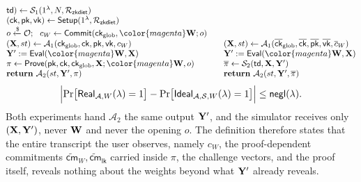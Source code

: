 \documentclass[sigconf,anonymous,review,balance=false]{acmart}
\newcommand{\rev}[1]{{\color{magenta}#1}}
\begin{document}
\begin{definition}
\[\begin{array}{@{}l@{\qquad}l@{}}
 \mathsf{td}) \leftarrow
 \mathcal{S}_{1}(1^{\lambda}, N, \mathcal{R}_{\mathsf{zkdiet}}) \\
(\mathsf{ck}, \mathsf{pk}, \mathsf{vk}) \leftarrow
 \mathsf{Setup}(1^{\lambda}, \mathcal{R}_{\mathsf{zkdiet}}) & \\
o \xleftarrow{\$} \mathcal{O};\ \
 c_{W} \leftarrow \mathsf{Commit}(\mathsf{ck}_{\mathrm{glob}}, \rev{\W}; o) & \\
(\X, st) \leftarrow \mathcal{A}_{1}(\mathsf{ck}_{\mathrm{glob}},
 \mathsf{ck}, \mathsf{pk}, \mathsf{vk}, c_{W}) &
(\X, st) \leftarrow
 \mathcal{A}_{1}(\overline{\mathsf{ck}}_{\mathrm{glob}},
 \overline{\mathsf{ck}}, \overline{\mathsf{pk}},
 \overline{\mathsf{vk}}, \overline{c}_{W}) \\
\Y' := \mathsf{Eval}(\rev{\W}, \X) &
\Y' := \mathsf{Eval}(\rev{\W}, \X) \\
\pi \leftarrow \mathsf{Prove}(\mathsf{pk}, \mathsf{ck},
 \mathsf{ck}_{\mathrm{glob}}, \X; \rev{\W}, o) &
\overline{\pi} \leftarrow \mathcal{S}_{2}(\mathsf{td}, \X,
 \Y') \\
\mathbf{return}\ \mathcal{A}_{2}(st, \Y', \pi) &
\mathbf{return}\ \mathcal{A}_{2}(st, \Y', \overline{\pi})
\end{array}
\]
\[
\Bigl| \Pr\bigl[\mathsf{Real}_{\mathcal{A}, W}(\lambda) = 1\bigr] -
       \Pr\bigl[\mathsf{Ideal}_{\mathcal{A}, \mathcal{S}, W}(\lambda) = 1\bigr]
\Bigr| \le \mathsf{negl}(\lambda).
\]
Both experiments hand $\mathcal{A}_{2}$ the same output ${\mathbf{Y}}'$, and the simulator receives only $({\mathbf{X}}, {\mathbf{Y}}')$, never \rev{${\mathbf{W}}$} and never the
opening $o$. The definition therefore states that the entire transcript the user observes, namely $c_{W}$, the proof-dependent commitments $\widetilde{\mathsf{cm}}_{W}, \widetilde{\mathsf{cm}}_{\mathsf{lk}}$ carried inside $\pi$, the challenge vectors, and the proof itself, reveals nothing about the weights beyond what ${\mathbf{Y}}'$ already reveals.
\end{definition}
\end{document}
